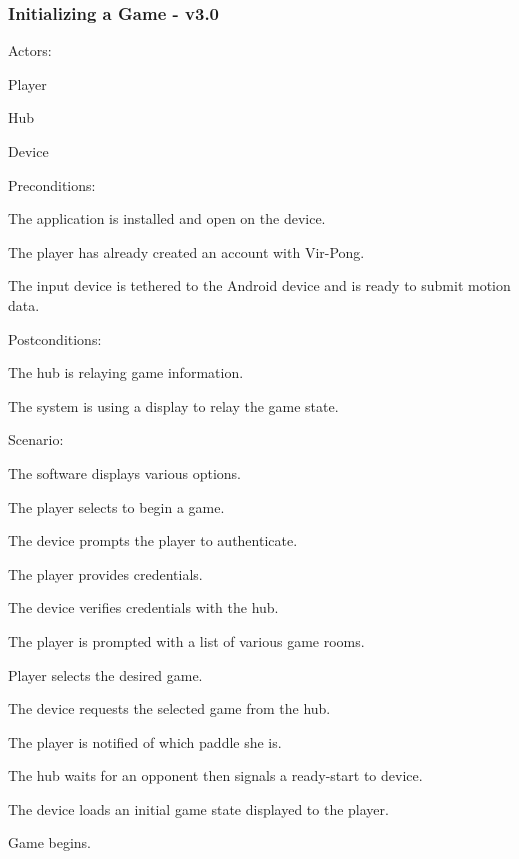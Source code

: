 \documentclass[12pt]{article}
\newenvironment{itemize*}%
  {\begin{itemize}%
  	\setlength{\parsep}{0pt}
    \setlength{\itemsep}{0pt}%
    \setlength{\parskip}{0pt}}%
  {\end{itemize}}
\newenvironment{enumerate*}%
  {\begin{enumerate}%
  	\setlength{\parsep}{0pt}
    \setlength{\itemsep}{0pt}%
    \setlength{\parskip}{0pt}}%
  {\end{enumerate}}
\begin{document}
\subsubsection*{Initializing a Game - v3.0}
Actors:
\begin{itemize*}
\item Player
\item Hub
\item Device
\end{itemize*}
Preconditions:
\begin{itemize*}
\item The application is installed and open on the device.
\item The player has already created an account with Vir-Pong.
\item The input device is tethered to the Android device and is ready to 
  submit motion data.
\end{itemize*}
Postconditions:
\begin{itemize*}
\item The hub is relaying game information.
\item The system is using a display to relay the game state.
\end{itemize*}
Scenario:
\begin{enumerate*}
\item \label{InitGame_DisplayOptions} The software displays various options.
\item \label{SelectStart}The player selects to begin a game.
\item \label{SystemPromptsAuthentication}The device prompts the player to 
  authenticate.
\item \label{PlayerProvidesCredentials}The player provides credentials.
\item \label{SystemVerifies}The device verifies credentials with the hub.
\item \label{DisplayGameRooms} The player is prompted with a list of various
game rooms.
\item \label{SelectRoom} Player selects the desired game.
\item \label{SystemRequestsGame}The device requests the selected game from 
the hub.
\item \label{NotifyPaddle} The player is notified of which paddle she is.
\item \label{HubSelectsOpponent}The hub waits for an opponent then signals a 
  ready-start to device.
\item \label{LoadGameState}The device loads an initial game state displayed 
  to the player.
\item Game begins.
\end{enumerate*}
\end{document}
